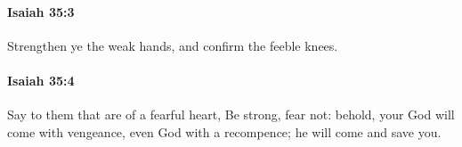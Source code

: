 		\paragraph{Isaiah 35:3} %
			\label{ISAIAH-35-3}

			Strengthen ye the weak hands, and confirm the feeble knees.


		\paragraph{Isaiah 35:4} %
			\label{ISAIAH-35-4}

			Say to them that are of a fearful heart, Be strong, fear not: behold, your God will come with vengeance, even God with a recompence; he will come and save you.


